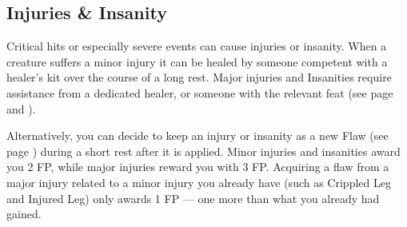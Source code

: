 
\subsection*{Injuries \& Insanity} \label{ssec::injuriesandinsanity}
    Critical hits or especially severe events can cause injuries or insanity.
    When a creature suffers a minor injury it can be healed by someone competent with a healer's kit over the course of a long rest.
    Major injuries and Insanities require assistance from a dedicated healer, or someone with the relevant feat (see page \pageref{feat::physician} and \pageref{feat::therapist}).

    Alternatively, you can decide to keep an injury or insanity as a new Flaw (see page \pageref{ssec::flaws}) during a short rest after it is applied.
    Minor injuries and insanities award you 2 FP, while major injuries reward you with 3 FP.
    Acquiring a flaw from a major injury related to a minor injury you already have (such as Crippled Leg and Injured Leg) only awards 1 FP --- one more than what you already had gained.

